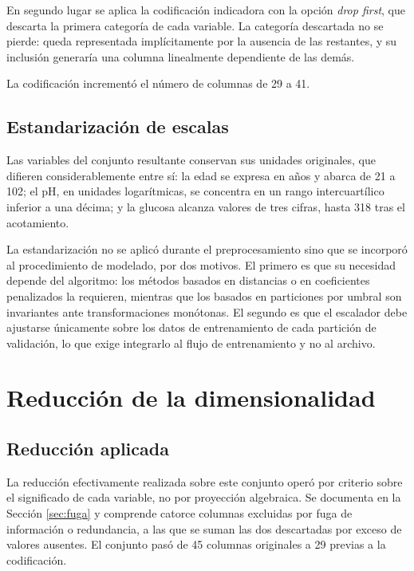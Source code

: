 \documentclass[11pt]{article}
\begin{document}
En segundo lugar se aplica la codificación indicadora con la opción \textit{drop first}, que
descarta la primera categoría de cada variable. La categoría descartada no se pierde: queda
representada implícitamente por la ausencia de las restantes, y su inclusión generaría una columna
linealmente dependiente de las demás.

La codificación incrementó el número de columnas de 29 a 41.

\subsection{Estandarización de escalas}

Las variables del conjunto resultante conservan sus unidades originales, que difieren
considerablemente entre sí: la edad se expresa en años y abarca de 21 a 102; el pH, en unidades
logarítmicas, se concentra en un rango intercuartílico inferior a una décima; y la glucosa alcanza
valores de tres cifras, hasta 318 tras el acotamiento.

La estandarización no se aplicó durante el preprocesamiento sino que se incorporó al procedimiento
de modelado, por dos motivos. El primero es que su necesidad depende del algoritmo: los métodos
basados en distancias o en coeficientes penalizados la requieren, mientras que los basados en
particiones por umbral son invariantes ante transformaciones monótonas. El segundo es que el
escalador debe ajustarse únicamente sobre los datos de entrenamiento de cada partición de
validación, lo que exige integrarlo al flujo de entrenamiento y no al archivo.

\section{Reducción de la dimensionalidad}
\label{sec:reduccion}

\subsection{Reducción aplicada}

La reducción efectivamente realizada sobre este conjunto operó por criterio sobre el significado
de cada variable, no por proyección algebraica. Se documenta en la Sección \ref{sec:fuga} y
comprende catorce columnas excluidas por fuga de información o redundancia, a las que se suman las
dos descartadas por exceso de valores ausentes. El conjunto pasó de 45 columnas originales a 29
previas a la codificación.
\end{document}
